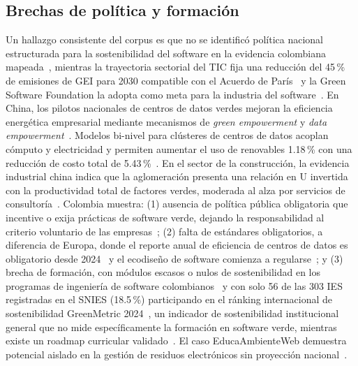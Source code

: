 \documentclass[conference]{IEEEtran}
\begin{document}
\subsection{Brechas de pol\'itica y formaci\'on}\label{sec:brechaspol}
Un hallazgo consistente del corpus es que no se identific\'o pol\'itica nacional estructurada para la sostenibilidad del software en la evidencia colombiana mapeada~\cite{bossa2023,rodriguezcorrea2023}, mientras la trayectoria sectorial del TIC fija una reducción del 45\,\% de emisiones de GEI para 2030 compatible con el Acuerdo de Par\'is~\cite{itu2020l1470} y la Green Software Foundation la adopta como meta para la industria del software~\cite{sandquist2021gsf}. En China, los pilotos nacionales de centros de datos verdes mejoran la eficiencia energ\'etica empresarial mediante mecanismos de \textit{green empowerment} y \textit{data empowerment}~\cite{wangHowCanNational2026}. Modelos bi-nivel para cl\'usteres de centros de datos acoplan c\'omputo y electricidad y permiten aumentar el uso de renovables 1.18\,\% con una reducci\'on de costo total de 5.43\,\%~\cite{zhangBilevelPlanningModel2026}. En el sector de la construcci\'on, la evidencia industrial china indica que la aglomeraci\'on presenta una relaci\'on en U invertida con la productividad total de factores verdes, moderada al alza por servicios de consultor\'ia~\cite{wangNonlinearImpactIndustrial2026}. Colombia muestra: (1) ausencia de pol\'itica p\'ublica obligatoria que incentive o exija pr\'acticas de software verde, dejando la responsabilidad al criterio voluntario de las empresas~\cite{rodriguezcorrea2023,bustamante2014}; (2) falta de est\'andares obligatorios, a diferencia de Europa, donde el reporte anual de eficiencia de centros de datos es obligatorio desde 2024~\cite{eu2023dir1791,eu2024reg1364} y el ecodiseño de software comienza a regularse~\cite{miranda2025,puerta2024}; y (3) brecha de formaci\'on, con m\'odulos escasos o nulos de sostenibilidad en los programas de ingenier\'ia de software colombianos~\cite{castro2025,puerta2024} y con solo 56 de las 303 IES registradas en el SNIES (18.5\,\%) participando en el r\'anking internacional de sostenibilidad GreenMetric 2024~\cite{greenmetric2024,observatorio2024}, un indicador de sostenibilidad institucional general que no mide espec\'ificamente la formaci\'on en software verde, mientras existe un roadmap curricular validado~\cite{moreira2024}. El caso EducaAmbienteWeb demuestra potencial aislado en la gesti\'on de residuos electr\'onicos sin proyecci\'on nacional~\cite{botero2023,sanchez2023}.
\end{document}
